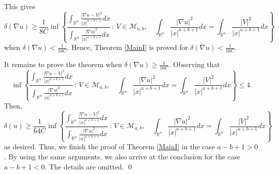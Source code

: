 \documentclass[a4paper,12pt]{article}
\theoremstyle{plain}
\theoremstyle{definition}
\theoremstyle{remark}
\def\R{\mathbb R}%
\def\irn{\int_{\R^n}}
\numberwithin{equation}{section}
\begin{document}
This gives
\begin{equation*}%
\delta(\nabla u) \geq \frac1{8C} \inf\left\{\frac{\irn \frac{|\nabla u - V|^2}{|x|^{a+b+1}} dx}{\irn \frac{|\nabla u |^2}{|x|^{a+b+1}} dx}\, :\, V \in \mathcal M_{a,b},\quad \irn \frac{|\nabla u |^2}{|x|^{a+b+1}} dx = \irn \frac{|V|^2}{|x|^{a+b+1}} dx\right\}
\end{equation*}
when $\delta (\nabla u) < \frac{1}{16C}$. Hence,  Theorem \ref{MainI} is proved for $\delta (\nabla u) < \frac{1}{16C}$.

































It remains to prove the theorem when  $\delta (\nabla u) \geq \frac{1}{16 C}$. Observing that 
$$\inf\left\{\frac{\irn \frac{|\nabla u - V|^2}{|x|^{a+b+1}} dx}{\irn \frac{|\nabla u |^2}{|x|^{a+b+1}} dx}\, :\, V \in \mathcal M_{a,b},\quad \irn \frac{|\nabla u |^2}{|x|^{a+b+1}} dx = \irn \frac{|V|^2}{|x|^{a+b+1}} dx\right\}\leq 4.$$
Then, 
\begin{equation*}%
	\delta(u) \geq \frac{1}{64C} \inf\left\{\frac{\irn \frac{|\nabla u - V|^2}{|x|^{a+b+1}} dx}{\irn \frac{|\nabla u |^2}{|x|^{a+b+1}} dx}\, :\, V \in \mathcal M_{a,b},\quad \irn \frac{|\nabla u |^2}{|x|^{a+b+1}} dx = \irn \frac{|V|^2}{|x|^{a+b+1}} dx\right\}
\end{equation*}
as desired. 
Thus, we finish the proof of Theorem \ref{MainI} in the case $a -b + 1> 0$. By using the same arguments, we also arrive at the conclusion for the case $a-b+1<0$. The details are omitted. \qed
\end{document}
